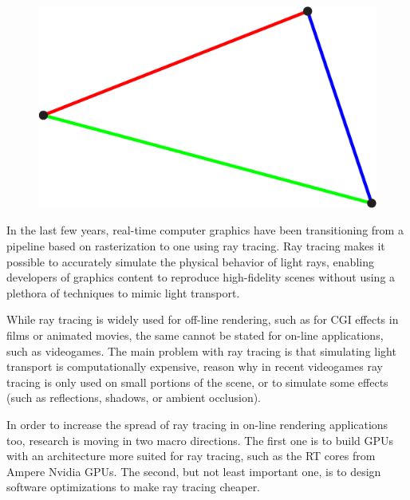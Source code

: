 \documentclass{PoliMi_MasterThesis}
\newcommand*\triangleLogo{
	\clearpage
	\thispagestyle{empty}
	\newpage
	\begin{figure}
		\centering
		\includegraphics[width=\textwidth]{Images/triangle_logo_thin.png} 
	\end{figure}
}
\begin{document}


\pagestyle{empty} %
\frontmatter %



\startpreamble
\triangleLogo
\setcounter{page}{1} %

\makeatletter
\let\savedchap\@makechapterhead
\def\@makechapterhead{\savedchap}
\let\@makechapterhead\savedchap
\makeatletter


In the last few years, real-time computer graphics have been transitioning from a pipeline based on rasterization to one using ray tracing.
Ray tracing makes it possible to accurately simulate the physical behavior of light rays, enabling developers of graphics content to reproduce high-fidelity scenes without using a plethora of techniques to mimic light transport.

While ray tracing is widely used for off-line rendering, such as for CGI effects in films or animated movies, the same cannot be stated for on-line applications, such as videogames. The main problem with ray tracing is that simulating light transport is computationally expensive, reason why in recent videogames ray tracing is only used on small portions of the scene, or to simulate some effects (such as reflections, shadows, or ambient occlusion).

In order to increase the spread of ray tracing in on-line rendering applications too, research is moving in two macro directions. The first one is to build GPUs with an architecture more suited for ray tracing, such as the RT cores from Ampere Nvidia GPUs. The second, but not least important one, is to design software optimizations to make ray tracing cheaper.
\end{document}
